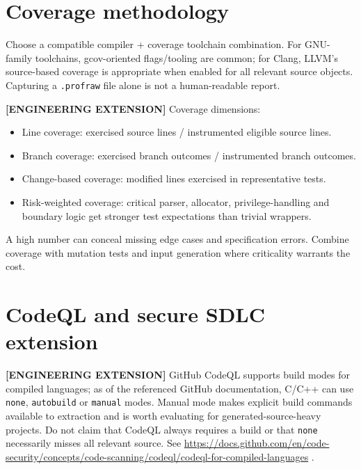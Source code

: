 \documentclass[11pt,letterpaper,oneside]{report}
\providecommand{\tightlist}{\setlength{\itemsep}{0pt}\setlength{\parskip}{0pt}}
\providecommand{\passthrough}[1]{#1}
\begin{document}
\chapter{Coverage methodology}\label{coverage-methodology}

Choose a compatible compiler + coverage toolchain combination. For
GNU-family toolchains, gcov-oriented flags/tooling are common; for
Clang, LLVM's source-based coverage is appropriate when enabled for all
relevant source objects. Capturing a \passthrough{\lstinline!.profraw!}
file alone is not a human-readable report.

\textbf{{[}ENGINEERING EXTENSION{]}} Coverage dimensions:

\begin{itemize}
\tightlist
\item
  Line coverage: exercised source lines / instrumented eligible source
  lines.
\item
  Branch coverage: exercised branch outcomes / instrumented branch
  outcomes.
\item
  Change-based coverage: modified lines exercised in representative
  tests.
\item
  Risk-weighted coverage: critical parser, allocator, privilege-handling
  and boundary logic get stronger test expectations than trivial
  wrappers.
\end{itemize}

A high number can conceal missing edge cases and specification errors.
Combine coverage with mutation tests and input generation where
criticality warrants the cost.

\chapter{CodeQL and secure SDLC
extension}\label{codeql-and-secure-sdlc-extension}

\textbf{{[}ENGINEERING EXTENSION{]}} GitHub CodeQL supports build modes
for compiled languages; as of the referenced GitHub documentation, C/C++
can use \passthrough{\lstinline!none!},
\passthrough{\lstinline!autobuild!} or \passthrough{\lstinline!manual!}
modes. Manual mode makes explicit build commands available to extraction
and is worth evaluating for generated-source-heavy projects. Do not
claim that CodeQL always requires a build or that
\passthrough{\lstinline!none!} necessarily misses all relevant source.
See
\url{https://docs.github.com/en/code-security/concepts/code-scanning/codeql/codeql-for-compiled-languages}
.
\end{document}
